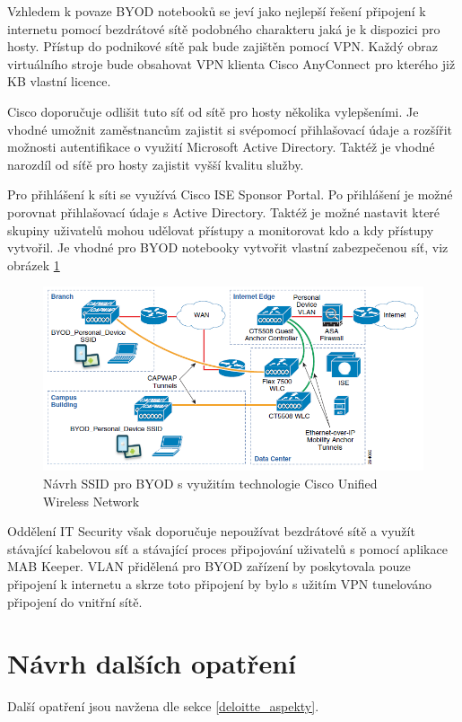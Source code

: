 Vzhledem k povaze BYOD notebooků se jeví jako nejlepší řešení připojení k internetu pomocí bezdrátové sítě podobného charakteru jaká je k dispozici pro hosty. Přístup do podnikové sítě pak bude zajištěn pomocí VPN. Každý obraz virtuálního stroje bude obsahovat VPN klienta Cisco AnyConnect pro kterého již KB vlastní licence.

Cisco doporučuje  odlišit tuto síť od sítě pro hosty několika vylepšeními. Je vhodné umožnit zaměstnancům zajistit si svépomocí přihlašovací údaje a rozšířit možnosti autentifikace o využití Microsoft Active Directory. Taktéž je vhodné narozdíl od síťě pro hosty zajistit vyšší kvalitu služby.

Pro přihlášení k síti se využívá Cisco ISE Sponsor Portal. Po přihlášení je možné porovnat přihlašovací údaje s Active Directory. Taktéž je možné nastavit které skupiny uživatelů mohou udělovat přístupy a monitorovat kdo a kdy přístupy vytvořil. Je vhodné pro BYOD notebooky vytvořit vlastní zabezpečenou síť, viz obrázek \ref{CiscoCUWN}

\begin{figure}[h!]
\centering
\includegraphics[width=13cm]{img/CiscoCUWN}
\caption{Návrh SSID pro BYOD s využitím technologie Cisco Unified Wireless Network}\label{CiscoCUWN}
\end{figure} 

Oddělení IT Security však doporučuje nepoužívat bezdrátové sítě a využít stávající kabelovou síť a stávající proces připojování uživatelů s pomocí aplikace MAB Keeper. VLAN přidělená pro BYOD zařízení by poskytovala pouze připojení k internetu a skrze toto připojení by bylo s užitím VPN tunelováno připojení do vnitřní sítě. 



\section{Návrh dalších opatření}\label{dalsi_opatreni}
Další opatření jsou navžena dle sekce \ref{deloitte_aspekty}.

